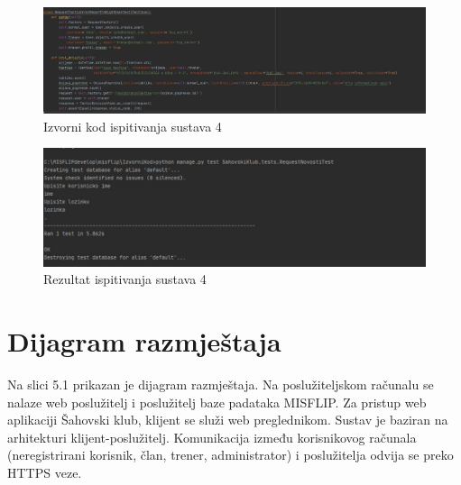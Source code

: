 			 \begin{figure}[H]
			 	\centerfloat
			 	\includegraphics[scale=0.40]{slike/ispitivanjesustava4izv.jpeg} %
			 	\caption{Izvorni kod ispitivanja sustava 4}
			 	
			 \end{figure}
			 
			 \begin{figure}[H]
			 	\centerfloat
			 	\includegraphics[scale=0.55]{slike/ispitivanjesustava3.jpeg} %
			 	\caption{Rezultat ispitivanja sustava 4}
			 	
			 \end{figure}
			
			\eject 
		
		
		\section{Dijagram razmještaja}
			
			
			Na slici 5.1 prikazan je dijagram razmještaja. Na poslužiteljskom računalu se nalaze web poslužitelj i poslužitelj baze padataka MISFLIP. Za pristup web aplikaciji Šahovski klub, klijent se služi web preglednikom. Sustav je baziran na arhitekturi klijent-poslužitelj. Komunikacija između korisnikovog računala (neregistrirani korisnik, član, trener, administrator) i poslužitelja odvija se preko HTTPS veze.
			
